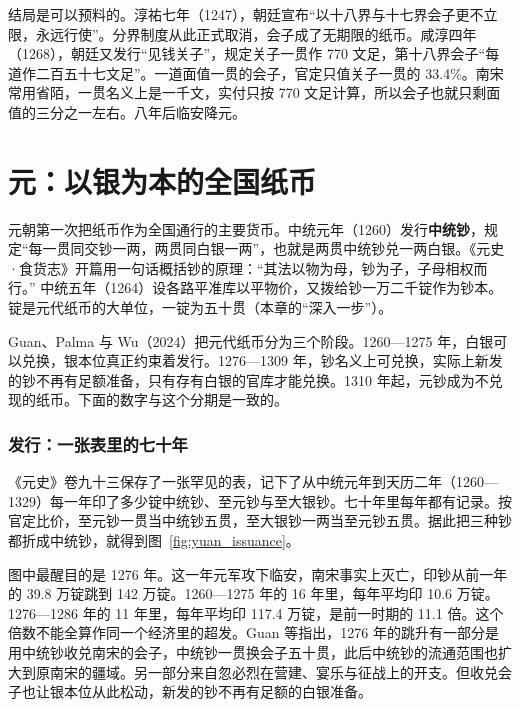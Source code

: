 结局是可以预料的。淳祐七年（1247），朝廷宣布“以十八界与十七界会子更不立限，永远行使”\cite{songshi}。分界制度从此正式取消，会子成了无期限的纸币。咸淳四年（1268），朝廷又发行“见钱关子”，规定关子一贯作 770 文足，第十八界会子“每道作二百五十七文足”\cite{songshi}。一道面值一贯的会子，官定只值关子一贯的 33.4\%。南宋常用省陌，一贯名义上是一千文，实付只按 770 文足计算，所以会子也就只剩面值的三分之一左右。八年后临安降元。

\section{元：以银为本的全国纸币}\label{sec:songming-yuan}

元朝第一次把纸币作为全国通行的主要货币\cite{guan2024}。中统元年（1260）发行\textbf{中统钞}，规定“每一贯同交钞一两，两贯同白银一两”\cite{yuanshi}，也就是两贯中统钞兑一两白银。《元史·食货志》开篇用一句话概括钞的原理：“其法以物为母，钞为子，子母相权而行。”\cite{yuanshi} 中统五年（1264）设各路平准库以平物价，又拨给钞一万二千锭作为钞本\cite{yuanshi}。锭是元代纸币的大单位，一锭为五十贯（本章的“深入一步”）。

Guan、Palma 与 Wu（2024）\cite{guan2024}把元代纸币分为三个阶段。1260—1275 年，白银可以兑换，银本位真正约束着发行。1276—1309 年，钞名义上可兑换，实际上新发的钞不再有足额准备，只有存有白银的官库才能兑换。1310 年起，元钞成为不兑现的纸币。下面的数字与这个分期是一致的。

\subsubsection{发行：一张表里的七十年}
《元史》卷九十三保存了一张罕见的表，记下了从中统元年到天历二年（1260—1329）每一年印了多少锭中统钞、至元钞与至大银钞\cite{yuanshi}。七十年里每年都有记录。按官定比价，至元钞一贯当中统钞五贯，至大银钞一两当至元钞五贯。据此把三种钞都折成中统钞，就得到图~\ref{fig:yuan_issuance}。


图中最醒目的是 1276 年。这一年元军攻下临安，南宋事实上灭亡，印钞从前一年的 39.8 万锭跳到 142 万锭。1260—1275 年的 16 年里，每年平均印 10.6 万锭。1276—1286 年的 11 年里，每年平均印 117.4 万锭，是前一时期的 11.1 倍。这个倍数不能全算作同一个经济里的超发。Guan 等指出，1276 年的跳升有一部分是用中统钞收兑南宋的会子，中统钞一贯换会子五十贯，此后中统钞的流通范围也扩大到原南宋的疆域。另一部分来自忽必烈在营建、宴乐与征战上的开支\cite{guan2024}。但收兑会子也让银本位从此松动，新发的钞不再有足额的白银准备。

